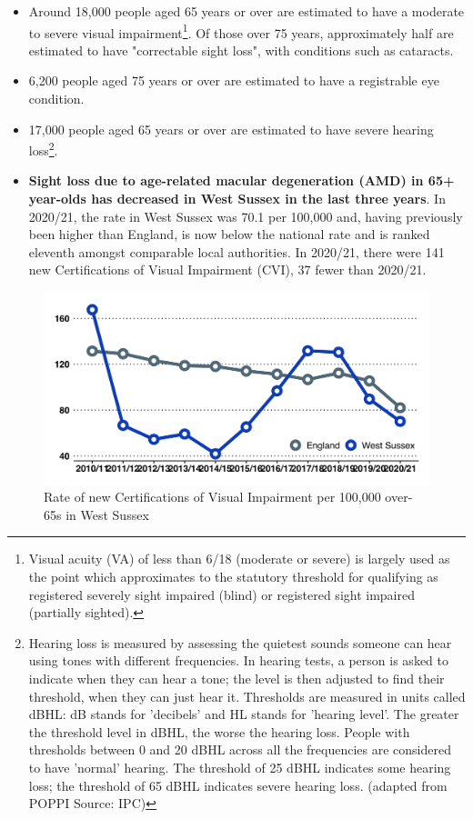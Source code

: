 \begin{itemize}
    \item Around 18,000 people aged 65 years or over are estimated to have a moderate to severe visual impairment\footnote{Visual acuity (VA) of less than 6/18 (moderate or severe) is largely used as the point which approximates to the statutory threshold for qualifying as registered severely sight impaired (blind) or registered sight impaired (partially sighted).}. Of those over 75 years, approximately half are estimated to have "correctable sight loss", with conditions such as cataracts.
    \item 6,200 people aged 75 years or over are estimated to have a registrable eye condition.
    \item 17,000 people aged 65 years or over are estimated to have severe hearing loss\footnote{Hearing loss is measured by assessing the quietest sounds someone can hear using tones with different frequencies. In hearing tests, a person is asked to indicate when they can hear a tone; the level is then adjusted to find their threshold, when they can just hear it. Thresholds are measured in units called dBHL: dB stands for 'decibels' and HL stands for 'hearing level'. The greater the threshold level in dBHL, the worse the hearing loss. People with thresholds between 0 and 20 dBHL across all the frequencies are considered to have 'normal' hearing. The threshold of 25 dBHL indicates some hearing loss; the threshold of 65 dBHL indicates severe hearing loss. (adapted from POPPI Source: IPC)}.
    \item {\bfseries Sight loss due to age-related macular degeneration (AMD) in 65+ year-olds has decreased in West Sussex in the last three years}. In 2020/21, the rate in West Sussex was 70.1 per 100,000 and, having previously been higher than England, is now below the national rate and is ranked eleventh amongst comparable local authorities. In 2020/21, there were 141 new Certifications of Visual Impairment (CVI), 37 fewer than 2020/21.
\end{itemize}


\begin{figure}
    \caption{Rate of new Certifications of Visual Impairment per 100,000 over-65s in West Sussex}\label{fig:amd_wsx}
    \centering
    \includegraphics[width=\linewidth]{images/amd_line.png}
\end{figure}

